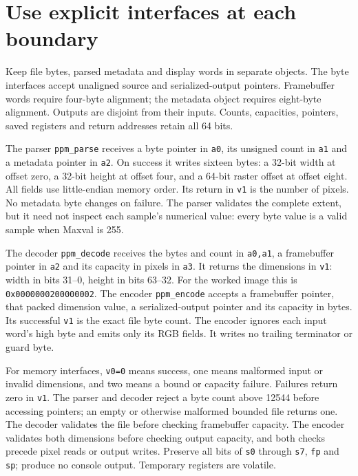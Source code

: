 \section{Use explicit interfaces at each boundary}
Keep file bytes, parsed metadata and display words in separate objects. The byte
interfaces accept unaligned source and serialized-output pointers. Framebuffer words
require four-byte alignment; the metadata object requires eight-byte alignment.
Outputs are disjoint from their inputs. Counts, capacities, pointers, saved registers
and return addresses retain all 64 bits.

The parser \texttt{ppm\_parse} receives a byte pointer in \texttt{a0}, its unsigned
count in \texttt{a1} and a metadata pointer in \texttt{a2}. On success it writes sixteen
bytes: a 32-bit width at offset zero, a 32-bit height at offset four, and a 64-bit raster
offset at offset eight. All fields use little-endian memory order. Its return in
\texttt{v1} is the number of pixels. No metadata byte changes on failure. The parser
validates the complete extent, but it need not inspect each sample's numerical value:
every byte value is a valid sample when Maxval is 255.

The decoder \texttt{ppm\_decode} receives the bytes and count in \texttt{a0,a1}, a
framebuffer pointer in \texttt{a2} and its capacity in pixels in \texttt{a3}. It returns
the dimensions in \texttt{v1}: width in bits 31--0, height in bits 63--32. For the
worked image this is \texttt{0x0000000200000002}. The encoder \texttt{ppm\_encode}
accepts a framebuffer pointer, that packed dimension value, a serialized-output pointer
and its capacity in bytes. Its successful \texttt{v1} is the exact file byte count.
The encoder ignores each input word's high byte and emits only its RGB fields. It
writes no trailing terminator or guard byte.

For memory interfaces, \texttt{v0=0} means success, one means malformed input or invalid
dimensions, and two means a bound or capacity failure. Failures return zero in
\texttt{v1}. The parser and decoder reject a byte count above 12544 before accessing
pointers; an empty or otherwise malformed bounded file returns one. The decoder
validates the file before checking framebuffer capacity. The encoder validates both
dimensions before checking output capacity, and both checks precede pixel reads or
output writes. Preserve all bits of \texttt{s0} through \texttt{s7}, \texttt{fp} and
\texttt{sp}; produce no console output. Temporary registers are volatile.

